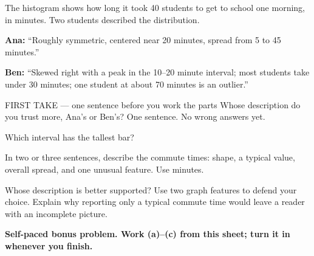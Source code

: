 \documentclass[14pt]{extarticle}
\begin{document}
\pagestyle{empty}


\noindent\begin{minipage}[t]{0.57\linewidth}
\vspace{0pt}
The histogram shows how long it took 40 students to get to school one morning, in minutes. Two students described the distribution.\par\smallskip \textbf{Ana:} ``Roughly symmetric, centered near 20 minutes, spread from 5 to 45 minutes.''\par \textbf{Ben:} ``Skewed right with a peak in the 10--20 minute interval; most students take under 30 minutes; one student at about 70 minutes is an outlier.''\par
\end{minipage}\hfill
\begin{minipage}[t]{0.40\linewidth}
\vspace{0pt}
\begin{center}
\end{center}
\end{minipage}

\begin{firsttakebox}{FIRST TAKE --- one sentence before you work the parts}
Whose description do you trust more, Ana's or Ben's? One sentence. No wrong answers yet.
\end{firsttakebox}

\begin{description}[leftmargin=1.15in, labelwidth=1in, itemsep=2pt, topsep=2pt]
  \item[\dokbadge{1}~(a)] Which interval has the tallest bar?
  \item[\dokbadge{2}~(b)] In two or three sentences, describe the commute times: shape, a typical value, overall spread, and one unusual feature. Use minutes.
  \item[\dokbadge{3}~(c)] Whose description is better supported? Use two graph features to defend your choice. Explain why reporting only a typical commute time would leave a reader with an incomplete picture.
\end{description}

\vfill
\textbf{Self-paced bonus problem. Work (a)--(c) from this sheet; turn it in whenever you finish.}
\end{document}
